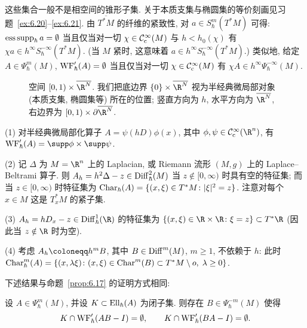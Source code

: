 这些集合一般不是相空间的锥形子集. 关于本质支集与椭圆集的等价刻画见习题~\ref{ex:6.20}--\ref{ex:6.21}. 由 $\overline{T^* M}$ 的纤维的紧致性, 对 $a \in S^m_{\hbar}(T^* M)$ 可得: $\operatorname{ess\,supp}_{\hbar} a = \emptyset$ 当且仅当对一切 $\chi \in \mathcal{C}_{\mathrm{c}}^\infty(M)$ 与 $h < h_0(\chi)$ 有 $\chi a \in h^\infty S^{-\infty}_{\hbar}(T^* M)$. (当 $M$ 紧时, 这意味着 $a \in h^\infty S^{-\infty}_{\hbar}(T^* M)$.) 类似地, 给定 $A \in \Psi^m_{\hbar}(M)$, $\operatorname{WF}'_{\hbar}(A) = \emptyset$ 当且仅当对一切 $\chi \in \mathcal{C}_{\mathrm{c}}^\infty(M)$ 有 $\chi A \in h^\infty \Psi^{-\infty}_{\hbar}(M)$.

\begin{figure}[htbp]
\centering
\drawFigSixEight
\caption{空间 $[0,1) \times \overline{\R^N}$. 我们把底边界 $\{0\} \times \overline{\R^N}$ 视为半经典微局部对象 (本质支集, 椭圆集等) 所在的位置; 竖直方向为 $h$, 水平方向为 $\overline{\R^N}$, 右边界为 $[0,1) \times \partial\overline{\R^N}$.}
\label{fig:6.8}
\end{figure}

\begin{example}[半经典特征集]\label{eg:6.53}
(1) 对半经典微局部化算子 $A = \psi(hD)\phi(x)$, 其中 $\phi, \psi \in \SmoothComp(\R^n)$, 有 $\WF'_{\hbar}(A) = \supp \phi \times \supp \psi$.

(2) 记 $\Delta$ 为 $M = \R^n$ 上的 Laplacian, 或 Riemann 流形 $(M, g)$ 上的 Laplace--Beltrami 算子. 则 $A_h = h^2\Delta - z \in \operatorname{Diff}^2_{\hbar}(M)$ 当 $z \notin [0, \infty)$ 时具有空的特征集; 而当 $z \in [0, \infty)$ 时特征集为 $\operatorname{Char}_{\hbar}(A) = \{(x, \xi) \in T^* M \colon |\xi|^2 = z\}$. 注意对每个 $x \in M$ 这是 $T^*_x M$ 的紧子集.

(3) $A_h = h D_x - z \in \Diff^1_{\hbar}(\R)$ 的特征集为 $\{(x, \xi) \in \R \times \R \colon \xi = z\} \subset T^* \R$ (因此当 $z \notin \R$ 时为空).

(4) 考虑 $A_h \defeq h^m B$, 其中 $B \in \operatorname{Diff}^m(M)$, $m \ge 1$, 不依赖于 $h$: 此时 $\operatorname{Char}^m_{\hbar}(A) = \{(x, \lambda\xi) \colon (x, \xi) \in \operatorname{Char}^m(B) \subset T^* M \setminus o, \; \lambda \ge 0\}$.
\end{example}

下述结果与命题~\ref{prop:6.17} 的证明方式相同:

\begin{proposition}[半经典微局部椭圆拟逆]\label{prop:6.54}
设 $A \in \Psi^m_{\hbar}(M)$, 并设 $K \subset \operatorname{Ell}_{\hbar}(A)$ 为闭子集. 则存在 $B \in \Psi^{-m}_{\hbar}(M)$ 使得
\begin{equation}\label{eq:6.110}
    K \cap \operatorname{WF}'_{\hbar}(A B - I) = \emptyset, \qquad K \cap \operatorname{WF}'_{\hbar}(B A - I) = \emptyset.
\end{equation}
\end{proposition}

